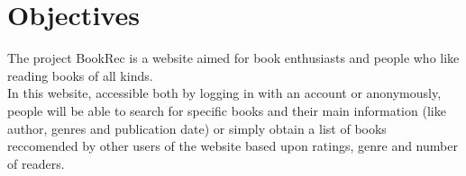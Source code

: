 \section{Objectives}


The project BookRec is a website aimed for book enthusiasts and people who like reading books of all kinds. \\
In this website, accessible both by logging in with an account or anonymously, people will be able to search for specific books and their main information (like author, genres and publication date) or simply obtain a list of books reccomended by other users of the website based upon ratings, genre and number of readers.